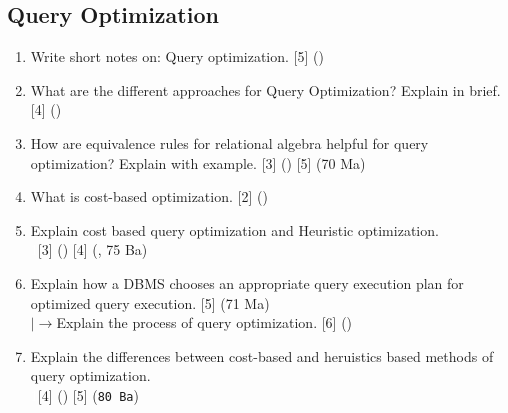 \documentclass[12pt]{article}
\newcommand{\lb}{\\$\left|\rightarrow\right.$}
\newcommand{\enter}{\\\textcolor{white}{1}}
\begin{document}
    \subsection{Query Optimization}
        \begin{enumerate}[noitemsep, topsep=0pt]
			\item Write short notes on: Query optimization. \hfill [5] ()        		
        		
        		\item What are the different approaches for Query Optimization? Explain in brief. \hfill [4] ()
        		
        		\item How are equivalence rules for relational algebra helpful for query optimization? Explain with example. \hfill [3] () [5] (70 Ma)
        		
			\item What is cost-based optimization. \hfill [2] ()        		
        		
			\item Explain cost based query optimization and Heuristic optimization.
			\enter\hfill [3] () [4] (, 75 Ba)        		
			\item Explain how a DBMS chooses an appropriate query execution plan for optimized query execution. \hfill [5] (71 Ma)
			\lb Explain the process of query optimization. \hfill [6] ()
        		
        		\item Explain the differences between cost-based and heruistics based methods of query optimization.
        		\enter\hfill [4] () [5] (\texttt{80 Ba})
        		

\end{enumerate}
\end{document}
